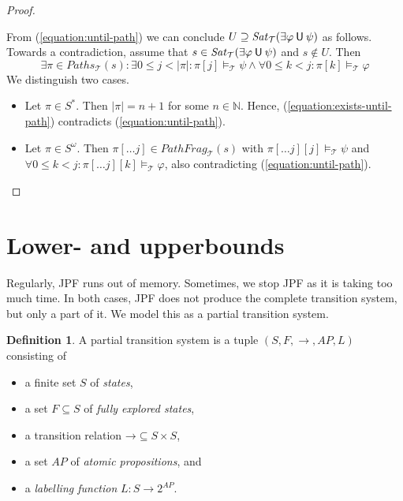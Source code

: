 \documentclass[12pt]{article}
\newcommand{\until}{\mathbin{\sf U}}
\theoremstyle{definition}
\newtheorem{definition}{Definition}
\begin{document}
\begin{proof}
\begin{itemize}
\begin{itemize}
\begin{itemize}
\begin{itemize}
\end{itemize}
\end{itemize}
\end{itemize}
From (\ref{equation:until-path}) we can conclude $U \supseteq \mathit{Sat}_{\mathcal{T}}(\exists \varphi \until \psi)$ as follows.  Towards a contradiction, assume that $s \in \mathit{Sat}_{\mathcal{T}}(\exists \varphi \until \psi)$ and $s \not\in U$.  Then
\begin{equation}
\label{equation:exists-until-path}
\exists \pi \in \mathit{Paths}_{\mathcal{T}}(s) : \exists 0 \leq j < |\pi| : \pi[j] \models_{\mathcal{T}} \psi \wedge \forall 0 \leq k < j : \pi[k] \models_{\mathcal{T}} \varphi 
\end{equation}
We distinguish two cases.
\begin{itemize}
\item 
Let $\pi \in S^*$.  Then $|\pi| = n + 1$ for some $n \in \mathbb{N}$.  Hence, (\ref{equation:exists-until-path}) contradicts (\ref{equation:until-path}).
\item
Let $\pi \in S^{\omega}$.  Then $\pi[\ldots j] \in \mathit{PathFrag}_{\mathcal{T}}(s)$ with $\pi[\ldots j][j] \models_{\mathcal{T}} \psi$ and $\forall 0 \leq k < j : \pi[\ldots j][k] \models_{\mathcal{T}} \varphi$, also contradicting (\ref{equation:until-path}).
\end{itemize}
\end{itemize}
\end{proof}

\section{Lower- and upperbounds}

Regularly, JPF runs out of memory.  Sometimes, we stop JPF as it is taking too much time.  In both cases, JPF does not produce the complete transition system, but only a part of it.  We model this as a partial transition system.

\begin{definition}
A partial transition system is a tuple $(S, F, \rightarrow, \mathit{AP}, L)$ consisting of
\begin{itemize}
\item 
a finite set $S$ of \emph{states},
\item
a set $F \subseteq S$ of \emph{fully explored states},
\item
a transition relation $\mathord{\rightarrow} \subseteq S \times S$,
\item
a set $\mathit{AP}$ of \emph{atomic propositions}, and
\item
a \emph{labelling function} $L : S \to 2^{\mathit{AP}}$.
\end{itemize}
\end{definition}
\end{document}
